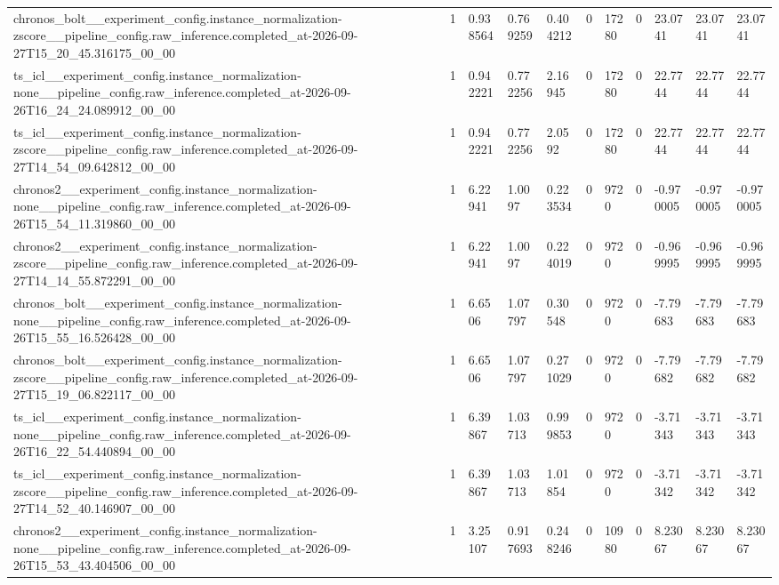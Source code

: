 \begin{tabular}{lllllllllll}
chronos\_bolt\_\_experiment\_config.instance\_normalization-zscore\_\_pipeline\_config.raw\_inference.completed\_at-2026-09-27T15\_20\_45.316175\_00\_00 & 1 & 0.938564 & 0.769259 & 0.404212 & 0 & 17280 & 0 & 23.0741 & 23.0741 & 23.0741 \\
ts\_icl\_\_experiment\_config.instance\_normalization-none\_\_pipeline\_config.raw\_inference.completed\_at-2026-09-26T16\_24\_24.089912\_00\_00 & 1 & 0.942221 & 0.772256 & 2.16945 & 0 & 17280 & 0 & 22.7744 & 22.7744 & 22.7744 \\
ts\_icl\_\_experiment\_config.instance\_normalization-zscore\_\_pipeline\_config.raw\_inference.completed\_at-2026-09-27T14\_54\_09.642812\_00\_00 & 1 & 0.942221 & 0.772256 & 2.0592 & 0 & 17280 & 0 & 22.7744 & 22.7744 & 22.7744 \\
chronos2\_\_experiment\_config.instance\_normalization-none\_\_pipeline\_config.raw\_inference.completed\_at-2026-09-26T15\_54\_11.319860\_00\_00 & 1 & 6.22941 & 1.0097 & 0.223534 & 0 & 9720 & 0 & -0.970005 & -0.970005 & -0.970005 \\
chronos2\_\_experiment\_config.instance\_normalization-zscore\_\_pipeline\_config.raw\_inference.completed\_at-2026-09-27T14\_14\_55.872291\_00\_00 & 1 & 6.22941 & 1.0097 & 0.224019 & 0 & 9720 & 0 & -0.969995 & -0.969995 & -0.969995 \\
chronos\_bolt\_\_experiment\_config.instance\_normalization-none\_\_pipeline\_config.raw\_inference.completed\_at-2026-09-26T15\_55\_16.526428\_00\_00 & 1 & 6.6506 & 1.07797 & 0.30548 & 0 & 9720 & 0 & -7.79683 & -7.79683 & -7.79683 \\
chronos\_bolt\_\_experiment\_config.instance\_normalization-zscore\_\_pipeline\_config.raw\_inference.completed\_at-2026-09-27T15\_19\_06.822117\_00\_00 & 1 & 6.6506 & 1.07797 & 0.271029 & 0 & 9720 & 0 & -7.79682 & -7.79682 & -7.79682 \\
ts\_icl\_\_experiment\_config.instance\_normalization-none\_\_pipeline\_config.raw\_inference.completed\_at-2026-09-26T16\_22\_54.440894\_00\_00 & 1 & 6.39867 & 1.03713 & 0.999853 & 0 & 9720 & 0 & -3.71343 & -3.71343 & -3.71343 \\
ts\_icl\_\_experiment\_config.instance\_normalization-zscore\_\_pipeline\_config.raw\_inference.completed\_at-2026-09-27T14\_52\_40.146907\_00\_00 & 1 & 6.39867 & 1.03713 & 1.01854 & 0 & 9720 & 0 & -3.71342 & -3.71342 & -3.71342 \\
chronos2\_\_experiment\_config.instance\_normalization-none\_\_pipeline\_config.raw\_inference.completed\_at-2026-09-26T15\_53\_43.404506\_00\_00 & 1 & 3.25107 & 0.917693 & 0.248246 & 0 & 10980 & 0 & 8.23067 & 8.23067 & 8.23067 \\

\end{tabular}
